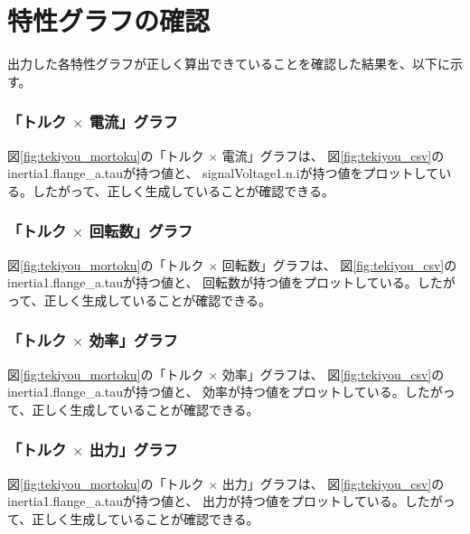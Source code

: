 \section{特性グラフの確認}
出力した各特性グラフが正しく算出できていることを確認した結果を、以下に示す。

\subsubsection{「トルク $\times$ 電流」グラフ}
図\ref{fig:tekiyou_mortoku}の「トルク $\times$ 電流」グラフは、
図\ref{fig:tekiyou_csv}のinertia1.flange\_a.tauが持つ値と、
signalVoltage1.n.iが持つ値をプロットしている。したがって、正しく生成していることが確認できる。

\subsubsection{「トルク $\times$ 回転数」グラフ}
図\ref{fig:tekiyou_mortoku}の「トルク $\times$ 回転数」グラフは、
図\ref{fig:tekiyou_csv}のinertia1.flange\_a.tauが持つ値と、
回転数が持つ値をプロットしている。したがって、正しく生成していることが確認できる。

\subsubsection{「トルク $\times$ 効率」グラフ}
図\ref{fig:tekiyou_mortoku}の「トルク $\times$ 効率」グラフは、
図\ref{fig:tekiyou_csv}のinertia1.flange\_a.tauが持つ値と、
効率が持つ値をプロットしている。したがって、正しく生成していることが確認できる。

\subsubsection{「トルク $\times$ 出力」グラフ}
図\ref{fig:tekiyou_mortoku}の「トルク $\times$ 出力」グラフは、
図\ref{fig:tekiyou_csv}のinertia1.flange\_a.tauが持つ値と、
出力が持つ値をプロットしている。したがって、正しく生成していることが確認できる。



